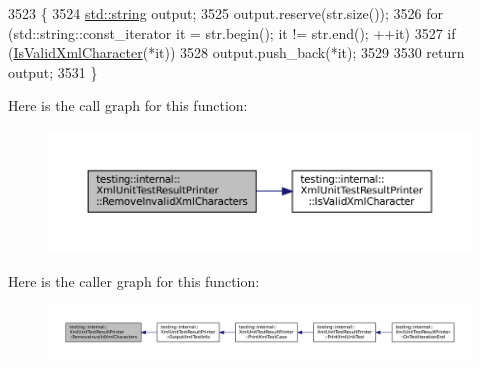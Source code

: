 \begin{DoxyCode}
3523                           \{
3524   \hyperlink{namespacetesting_1_1internal_a8e8ff5b11e64078831112677156cb111}{std::string} output;
3525   output.reserve(str.size());
3526   \textcolor{keywordflow}{for} (std::string::const\_iterator it = str.begin(); it != str.end(); ++it)
3527     \textcolor{keywordflow}{if} (\hyperlink{classtesting_1_1internal_1_1XmlUnitTestResultPrinter_a2b83a24e3ec8544efa1156f9d6e51873}{IsValidXmlCharacter}(*it))
3528       output.push\_back(*it);
3529 
3530   \textcolor{keywordflow}{return} output;
3531 \}
\end{DoxyCode}
Here is the call graph for this function\+:
\nopagebreak
\begin{figure}[H]
\begin{center}
\leavevmode
\includegraphics[width=350pt]{classtesting_1_1internal_1_1XmlUnitTestResultPrinter_aa14cb72f42a346841482cbafa65e3155_cgraph}
\end{center}
\end{figure}
Here is the caller graph for this function\+:
\nopagebreak
\begin{figure}[H]
\begin{center}
\leavevmode
\includegraphics[width=350pt]{classtesting_1_1internal_1_1XmlUnitTestResultPrinter_aa14cb72f42a346841482cbafa65e3155_icgraph}
\end{center}
\end{figure}
\mbox{\label{classtesting_1_1internal_1_1XmlUnitTestResultPrinter_aaac4f1352a2cc46f6a69994d45999f0b}} 
